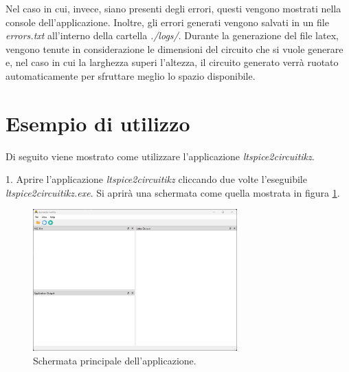 Nel caso in cui, invece, siano presenti degli errori, questi vengono mostrati nella console dell'applicazione. Inoltre, gli errori generati vengono salvati in un file \textit{errors.txt} all'interno della cartella \textit{./logs/}.
Durante la generazione del file latex, vengono tenute in considerazione le dimensioni del circuito che si vuole generare e, nel caso in cui la larghezza superi l'altezza, il circuito generato verrà ruotato automaticamente per sfruttare meglio lo spazio disponibile. 

\clearpage

\section{Esempio di utilizzo}
Di seguito viene mostrato come utilizzare l'applicazione \textit{ltspice2circuitikz}. 

1. Aprire l'applicazione \textit{ltspice2circuitikz} cliccando due volte l'eseguibile \textit{ltspice2circuitikz.exe}. Si aprirà una schermata come quella mostrata in figura \ref{fig:punto_1}.


\begin{figure}[h!]
	\centering
	\includegraphics[width=0.7\textwidth]{./ImageFiles/mainview.png}
	\caption{Schermata principale dell'applicazione.}
	\label{fig:punto_1}
\end{figure}

